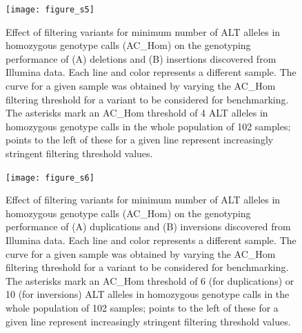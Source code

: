 \documentclass[12pt]{article}
\newenvironment{cfigure}
	{\begin{figure} \centering}
	{\end{figure}}
\begin{document}
\clearpage%

\begin{cfigure}
	\texttt{[image: figure\_s5]}

	\caption[Effect of ALT allele count on genotyping performance of Illumina deletions and insertions]{
		Effect of filtering variants for minimum number of ALT alleles in homozygous genotype calls (AC\_Hom) on the genotyping performance of (A) deletions and (B) insertions discovered from Illumina data.
		Each line and color represents a different sample.
		The curve for a given sample was obtained by varying the AC\_Hom filtering threshold for a variant to be considered for benchmarking.
		The asterisks mark an AC\_Hom threshold of 4 ALT alleles in homozygous genotype calls in the whole population of 102 samples; points to the left of these for a given line represent increasingly stringent filtering threshold values.
	}

	\label{fig_s5}

\end{cfigure}

\clearpage%

\begin{cfigure}
	\texttt{[image: figure\_s6]}

	\caption[Effect of ALT allele count on genotyping performance of Illumina duplications and inversions]{
		Effect of filtering variants for minimum number of ALT alleles in homozygous genotype calls (AC\_Hom) on the genotyping performance of (A) duplications and (B) inversions discovered from Illumina data.
		Each line and color represents a different sample.
		The curve for a given sample was obtained by varying the AC\_Hom filtering threshold for a variant to be considered for benchmarking.
		The asterisks mark an AC\_Hom threshold of 6 (for duplications) or 10 (for inversions) ALT alleles in homozygous genotype calls in the whole population of 102 samples; points to the left of these for a given line represent increasingly stringent filtering threshold values.
	}

	\label{fig_s6}

\end{cfigure}

\clearpage%
\end{document}
